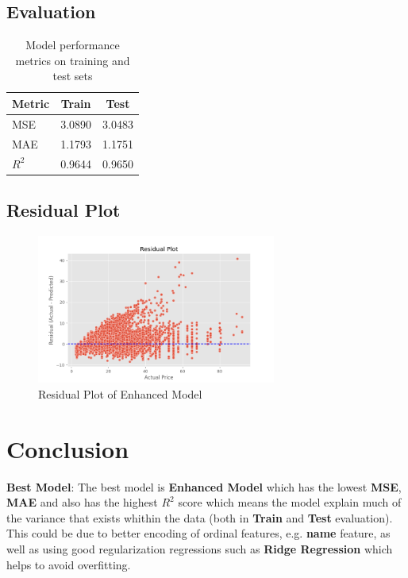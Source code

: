 \documentclass[a4paper,12pt]{article}
\begin{document}
\subsection*{Evaluation}
\begin{table}[H]
    \centering
    \begin{tabular}{|l|c|c|}
    \hline
    \textbf{Metric} & \textbf{Train} & \textbf{Test} \\
    \hline
    MSE & 3.0890 & 3.0483 \\
    MAE & 1.1793 & 1.1751 \\
    $R^2$ & 0.9644 & 0.9650 \\
    \hline
    \end{tabular}
    \caption{Model performance metrics on training and test sets}
    \label{tab:model-metrics}
\end{table}



\subsection*{Residual Plot}

\begin{figure}[H]
    \centering
    \includegraphics[width=0.7\textwidth]{./images/residual_of_enhanced.png}
    \caption{Residual Plot of Enhanced Model}
    \label{fig:fig_2}
\end{figure}


\section*{Conclusion}

\textbf{Best Model}: The best model is \textbf{Enhanced Model} which has the lowest \textbf{MSE}, \textbf{MAE} and also has the highest $R^2$ score which means the model explain much of the variance that exists whithin the data (both in \textbf{Train} and \textbf{Test} evaluation). This could be due to better encoding of ordinal features, e.g. \textbf{name} feature, as well as using good regularization regressions such as \textbf{Ridge Regression} which helps to avoid overfitting.
\end{document}

